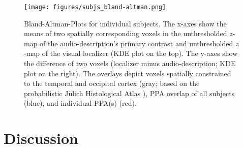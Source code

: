 \documentclass[english]{article}
\begin{document}
\begin{figure}[h!]
\centering
    \texttt{[image: figures/subjs\_bland-altman.png]}
    \caption{Bland-Altman-Plots for individual subjects.
    The x-axes show the means of two spatially corresponding voxels in the
    unthresholded $z$-map of the audio-description's primary contrast and
    unthresholded $z$-map of the visual localizer (KDE plot on the top).
    The y-axes show the difference of two voxels (localizer minus
    audio-description; KDE plot on the right).
    The overlays depict voxels spatially constrained to the
    temporal and occipital cortex (gray; based on the probabilistic Jülich
    Histological Atlas \citep{eickhoff2005toolbox, eickhoff2007assignment}),
    PPA overlap of all subjects (blue),
    and individual PPA(s) (red).}
    \label{fig:bland-altman}
\end{figure}



\section{Discussion}




\end{document}
